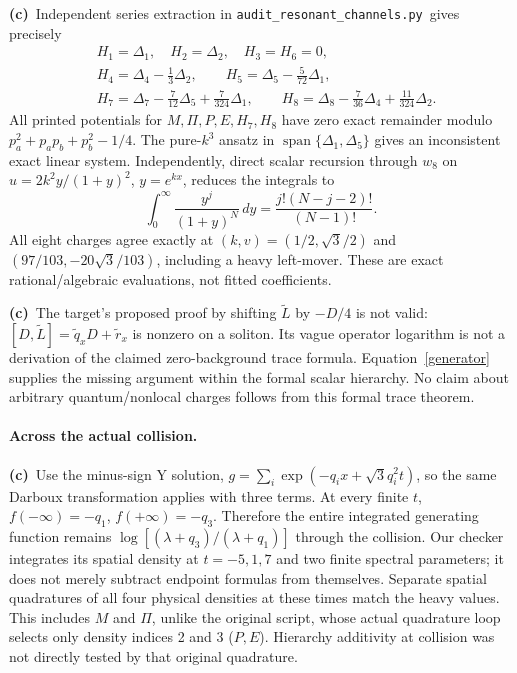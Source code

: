 \documentclass[11pt,a4paper]{article}
\newcommand{\Lc}{\textbf{(c)}\ }
\newcommand{\scr}{\texttt{audit\_\allowbreak resonant\_\allowbreak channels.py}}
\begin{document}
\Lc Independent series extraction in \scr\ gives precisely
\begin{align*}
&H_1=\Delta_1,\quad H_2=\Delta_2,\quad H_3=H_6=0,\\
&H_4=\Delta_4-\tfrac13\Delta_2,\qquad H_5=\Delta_5-\tfrac5{72}\Delta_1,\\
&H_7=\Delta_7-\tfrac7{12}\Delta_5+\tfrac7{324}\Delta_1,\qquad
 H_8=\Delta_8-\tfrac7{36}\Delta_4+\tfrac{11}{324}\Delta_2.
\end{align*}
All printed potentials for $M,\Pi,P,E,H_7,H_8$ have zero exact remainder
modulo $p_a^2+p_ap_b+p_b^2-1/4$. The pure-$k^3$ ansatz in
$\operatorname{span}\{\Delta_1,\Delta_5\}$ gives an inconsistent exact linear
system. Independently, direct scalar recursion through $w_8$ on
$u=2k^2y/(1+y)^2$, $y=e^{kx}$, reduces the integrals to
\[
 \int_0^\infty\frac{y^j}{(1+y)^N}\,dy
 =\frac{j!(N-j-2)!}{(N-1)!}.
\]
All eight charges agree exactly at $(k,v)=(1/2,\sqrt3/2)$ and
$(97/103,-20\sqrt3/103)$, including a heavy left-mover. These are exact
rational/algebraic evaluations, not fitted coefficients.

\Lc The target's proposed proof by shifting $\widetilde L$ by $-D/4$ is
not valid: $[D,\widetilde L]=\widetilde q_xD+\widetilde r_x$ is nonzero on a
soliton. Its vague operator logarithm is not a derivation of the claimed
zero-background trace formula. Equation~\eqref{generator} supplies the missing
argument within the formal scalar hierarchy. No claim about arbitrary
quantum/nonlocal charges follows from this formal trace theorem.

\paragraph{Across the actual collision.}
\Lc Use the minus-sign Y solution, $g=\sum_i\exp(-q_ix+\sqrt3q_i^2t)$, so the
same Darboux transformation applies with three terms. At every finite $t$,
$f(-\infty)=-q_1$, $f(+\infty)=-q_3$. Therefore the entire integrated generating
function remains $\log[(\lambda+q_3)/(\lambda+q_1)]$ through the collision.
Our checker integrates its spatial density at $t=-5,1,7$ and two finite
spectral parameters; it does not merely subtract endpoint formulas from
themselves. Separate spatial quadratures of all four physical densities at
these times match the heavy values. This includes $M$ and $\Pi$, unlike the
original script, whose actual quadrature loop selects only density indices
2 and 3 ($P,E$). Hierarchy additivity at collision was not directly tested by
that original quadrature.
\end{document}
